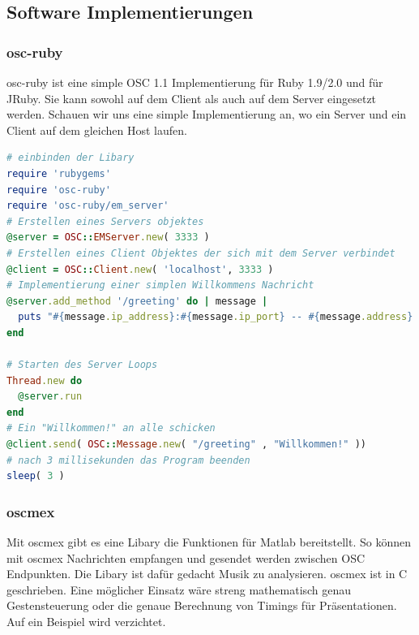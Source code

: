 \documentclass[a4paper, 12pt]{article}
\begin{document}
\subsection{Software Implementierungen}
\subsubsection{osc-ruby}
osc-ruby ist eine simple OSC 1.1 Implementierung für Ruby 1.9/2.0 und für JRuby.
Sie kann sowohl auf dem Client als auch auf dem Server eingesetzt werden.
Schauen wir uns eine simple Implementierung an, wo ein Server und ein Client auf dem gleichen Host laufen.\cite{oscruby}
\newpage
\begin{lstlisting}[language=ruby]
# einbinden der Libary
require 'rubygems'
require 'osc-ruby'
require 'osc-ruby/em_server'
# Erstellen eines Servers objektes
@server = OSC::EMServer.new( 3333 )
# Erstellen eines Client Objektes der sich mit dem Server verbindet
@client = OSC::Client.new( 'localhost', 3333 )
# Implementierung einer simplen Willkommens Nachricht
@server.add_method '/greeting' do | message |
  puts "#{message.ip_address}:#{message.ip_port} -- #{message.address} -- #{message.to_a}"
end

# Starten des Server Loops
Thread.new do
  @server.run
end
# Ein "Willkommen!" an alle schicken
@client.send( OSC::Message.new( "/greeting" , "Willkommen!" ))
# nach 3 millisekunden das Program beenden
sleep( 3 )
\end{lstlisting}

\subsubsection{oscmex}
Mit oscmex gibt es eine Libary die Funktionen für Matlab bereitstellt.
So können mit oscmex Nachrichten empfangen und gesendet werden zwischen OSC Endpunkten.
Die Libary ist dafür gedacht Musik zu analysieren. oscmex ist in C geschrieben.
Eine möglicher Einsatz wäre streng mathematisch genau Gestensteuerung oder die genaue Berechnung von Timings für Präsentationen. Auf ein Beispiel wird verzichtet.\cite{oscmex}
\end{document}
